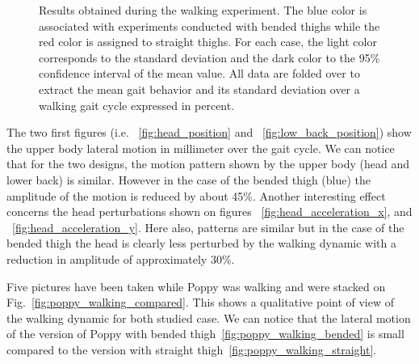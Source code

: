 \begin{figure}[h]
    \hfil
    \hfil
    \hfil
    \caption{Results obtained during the walking experiment.
    The blue color is associated with experiments conducted with bended thighs while the red color is assigned to straight thighs.
    For each case, the light color corresponds to the standard deviation and the dark color to the 95\% confidence interval of the mean value.
    All data are folded over to extract the mean gait behavior and its standard deviation over a walking gait cycle expressed in percent.}
    \label{fig:walk_result}
\end{figure}

The two first figures (i.e.
~\ref{fig:head_position} and ~\ref{fig:low_back_position}) show the upper body lateral motion in millimeter over the gait cycle.
We can notice that for the two designs, the motion pattern shown by the upper body (head and lower back) is similar.
However in the case of the bended thigh (blue) the amplitude of the motion is reduced by about 45\%.
Another interesting effect concerns the head perturbations shown on figures ~\ref{fig:head_acceleration_x}, and ~\ref{fig:head_acceleration_y}.
Here also, patterns are similar but in the case of the bended thigh the head is clearly less perturbed by the walking dynamic with a reduction in amplitude of approximately 30\%.

Five pictures have been taken while Poppy was walking and were stacked on Fig.~\ref{fig:poppy_walking_compared}.
This shows a qualitative point of view of the walking dynamic for both studied case.
We can notice that the lateral motion of the version of Poppy with bended thigh~\ref{fig:poppy_walking_bended} is small compared to the version with straight thigh~\ref{fig:poppy_walking_straight}.


